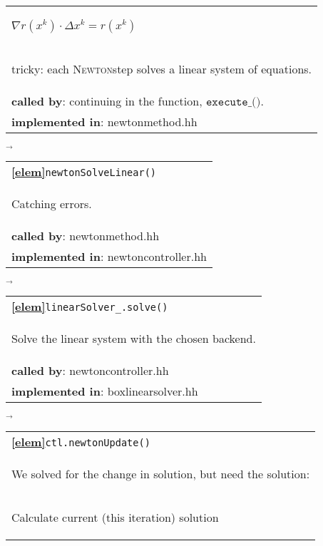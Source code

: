 \begin{landscape}
{\begin{tabular}{|l|}
      \begin{scriptsize}$\nabla r(x^k) \cdot \Delta x^k = r(x^k)$\end{scriptsize}\\
      \begin{scriptsize}tricky: each \textsc{Newton}step solves a linear system of equations. \end{scriptsize}\\
      \textbf{called by}: continuing in the function, $\texttt{execute\_()}$. \\
      \textbf{implemented in}: newtonmethod.hh\\
	\hline
  \end{tabular}
\nextline
    {\scriptsize$\overrightarrow{}
    $}
   \begin{tabular}{|l|}
      \hline
      \textbf{\textcircled{\ref{elem}}}\verb+newtonSolveLinear()+\\
      \begin{scriptsize}Catching errors.\end{scriptsize}\\
      \textbf{called by}: newtonmethod.hh\\
      \textbf{implemented in}: newtoncontroller.hh\\
	\hline
  \end{tabular}
    {\scriptsize$\overrightarrow{}
    $}
   \begin{tabular}{|l|}
      \hline
      \textbf{\textcircled{\ref{elem}}}\verb+linearSolver_.solve()+\\
      \begin{scriptsize}Solve the linear system with the chosen backend.\end{scriptsize}\\
      \textbf{called by}: newtoncontroller.hh\\
      \textbf{implemented in}: boxlinearsolver.hh\\
	\hline
  \end{tabular}
\nextline
    {\scriptsize$\overrightarrow{}
    $}
   \begin{tabular}{|l|}
      \hline
      \textbf{\textcircled{\ref{elem}}}\verb+ctl.newtonUpdate()+\\
      \begin{scriptsize}We solved for  the change in solution, but need the solution:\end{scriptsize}\\
      \begin{scriptsize}Calculate current (this iteration) solution\end{scriptsize}\\

\end{tabular}}
\end{landscape}
